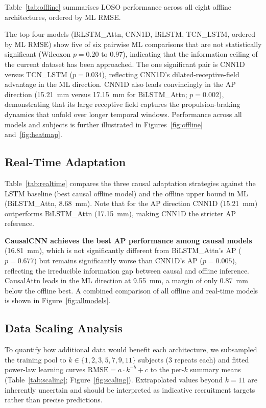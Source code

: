\documentclass[preprint,12pt]{elsarticle}
\begin{document}
Table~\ref{tab:offline} summarises LOSO performance across all eight offline
architectures, ordered by ML RMSE.

The top four models (BiLSTM\_Attn, CNN1D, BiLSTM, TCN\_LSTM, ordered by ML RMSE)
show five of six pairwise ML comparisons that are not statistically significant
(Wilcoxon $p = 0.20$ to $0.97$), indicating that the information ceiling of the
current dataset has been approached.
The one significant pair is CNN1D versus TCN\_LSTM ($p = 0.034$), reflecting
CNN1D's dilated-receptive-field advantage in the ML direction.
CNN1D also leads convincingly in the AP direction (15.21~mm versus 17.15~mm for
BiLSTM\_Attn; $p = 0.002$), demonstrating that its large receptive field captures
the propulsion-braking dynamics that unfold over longer temporal windows.
Performance across all models and subjects is further illustrated in
Figures~\ref{fig:offline} and~\ref{fig:heatmap}.

\subsection{Real-Time Adaptation}
\label{subsec:rt_results}

Table~\ref{tab:realtime} compares the three causal adaptation strategies against
the LSTM baseline (best causal offline model) and the offline upper bound in ML
(BiLSTM\_Attn, 8.68~mm).
Note that for the AP direction CNN1D (15.21~mm) outperforms BiLSTM\_Attn
(17.15~mm), making CNN1D the stricter AP reference.

\noindent\textbf{CausalCNN achieves the best AP performance among causal models}
(16.81~mm), which is not significantly different from BiLSTM\_Attn's AP
($p = 0.677$) but remains significantly worse than CNN1D's AP ($p = 0.005$),
reflecting the irreducible information gap between causal and offline inference.
CausalAttn leads in the ML direction at 9.55~mm, a margin of only 0.87~mm below
the offline best.
A combined comparison of all offline and real-time models is shown in
Figure~\ref{fig:allmodels}.

\subsection{Data Scaling Analysis}
\label{subsec:scaling}

To quantify how additional data would benefit each architecture, we subsampled the
training pool to $k \in \{1, 2, 3, 5, 7, 9, 11\}$ subjects (3 repeats each) and
fitted power-law learning curves $\mathrm{RMSE} = a \cdot k^{-b} + c$ to the
per-$k$ summary means (Table~\ref{tab:scaling}; Figure~\ref{fig:scaling}).
Extrapolated values beyond $k = 11$ are inherently uncertain and should be
interpreted as indicative recruitment targets rather than precise predictions.
\end{document}
